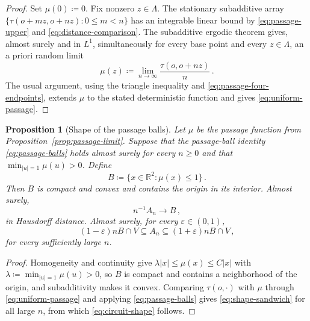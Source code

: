 \documentclass[11pt]{amsart}
\theoremstyle{plain}
\newtheorem{proposition}[theorem]{Proposition}
\theoremstyle{definition}
\newcommand{\R}{\mathbb R}
\begin{document}
	\begin{proof}
		Set $\mu(0)\coloneqq0$. Fix nonzero $z\in\Lambda$.  The stationary
		subadditive array
		$\{\tau(o+mz,o+nz):0\leq m<n\}$ has an integrable linear bound by
		\eqref{eq:passage-upper} and \eqref{eq:distance-comparison}.  The
		subadditive ergodic theorem \citep[Theorems~3 and~5]{Kingman1968} gives,
		almost surely and in $L^1$, simultaneously for every base point and every
		$z\in\Lambda$, an a priori random limit
		\begin{equation}\label{eq:directional-limit}
			\mu(z)\coloneqq
			\lim_{n\to\infty}\frac{\tau(o,o+nz)}n\, .
		\end{equation}
		The usual argument, using the triangle inequality and
		\eqref{eq:passage-four-endpoints}, extends $\mu$ to the stated deterministic
		function and gives \eqref{eq:uniform-passage}.
	\end{proof}
	
	
	
	\begin{proposition}[Shape of the passage balls]\label{prop:circuit-shape}
		Let $\mu$ be the passage function from
		Proposition~\ref{prop:passage-limit}.  Suppose that the passage-ball identity
		\eqref{eq:passage-balls} holds almost surely for every $n\geq0$ and that
		$\min_{|u|=1}\mu(u)>0$.  Define
		\begin{equation}\label{eq:limit-shape-body}
			B\coloneqq\{x\in\R^2:\mu(x)\leq1\}\, .
		\end{equation}
		Then $B$ is compact and convex and contains the origin in its interior.
		Almost surely,
		\begin{equation}\label{eq:circuit-shape}
			n^{-1}A_n\longrightarrow B\, ,
		\end{equation}
		in Hausdorff distance.  Almost surely, for every $\varepsilon\in(0,1)$,
		\begin{equation}\label{eq:shape-sandwich}
			(1-\varepsilon)nB\cap V
			\subseteq A_n
			\subseteq(1+\varepsilon)nB\cap V\, ,
		\end{equation}
		for every sufficiently large $n$.
	\end{proposition}
	
	\begin{proof}
		Homogeneity and continuity give $\lambda|x|\leq\mu(x)\leq C|x|$ with
		$\lambda\coloneqq\min_{|u|=1}\mu(u)>0$, so $B$ is compact and contains a
		neighborhood of the origin, and subadditivity makes it convex.  Comparing
		$\tau(o,\cdot)$ with $\mu$ through \eqref{eq:uniform-passage} and applying
		\eqref{eq:passage-balls} gives \eqref{eq:shape-sandwich} for all large $n$,
		from which \eqref{eq:circuit-shape} follows.
	\end{proof}
	
\end{document}
